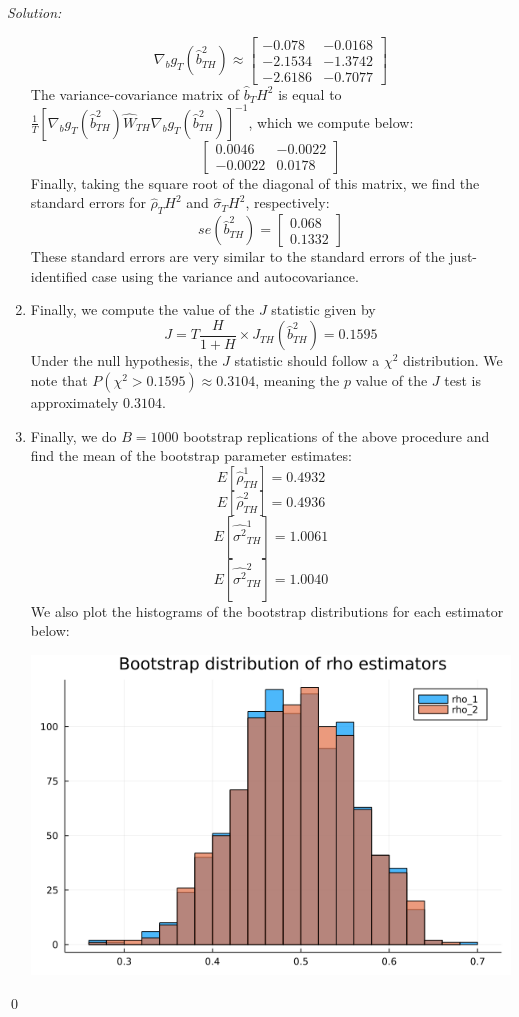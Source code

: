 \documentclass[12pt]{article}
\newenvironment{sol}
    {\emph{Solution:}
    }
    {
    \qed
    }
\begin{document}
\begin{sol}
\begin{enumerate}[label=\alph*) ]
        \[\nabla_b g_T(\hat{b}_{TH}^2) \approx \begin{bmatrix}-0.078 &-0.0168\\ -2.1534& -1.3742\\ -2.6186 &-0.7077\end{bmatrix}\]
        The variance-covariance matrix of $\hat{b}_TH^2$ is equal to $\frac{1}{T}[\nabla_b g_T(\hat{b}_{TH}^2) \hat{W}_{TH} \nabla_b g_T(\hat{b}_{TH}^2)]^{-1}$, which we compute below:
        \[\begin{bmatrix} 0.0046 &-0.0022\\ -0.0022 &0.0178\end{bmatrix}\]
        Finally, taking the square root of the diagonal of this matrix, we find the standard errors for $\hat{\rho}_TH^2$ and $\hat{\sigma}_TH^2$, respectively:
        \[se(\hat{b}_{TH}^2) = \begin{bmatrix} 0.068\\ 0.1332\end{bmatrix}\]
        These standard errors are very similar to the standard errors of the just-identified case using the variance and autocovariance.
        \item Finally, we compute the value of the $J$ statistic given by
        \[J = T \frac{H}{1 + H}\times J_{TH}(\hat{b}_{TH}^2) = 0.1595\]
        Under the null hypothesis, the $J$ statistic should follow a $\chi^2$ distribution. We note that $P(\chi^2 > 0.1595) \approx 0.3104$, meaning the $p$ value of the $J$ test is approximately $0.3104$. 
        \item Finally, we do $B=1000$ bootstrap replications of the above procedure and find the mean of the bootstrap parameter estimates:
        \[E[\hat{\rho}_{TH}^1] = 0.4932\]
        \[E[\hat{\rho}_{TH}^2] = 0.4936\]
        \[E[\hat{\sigma^2}_{TH}^1] = 1.0061\]
        \[E[\hat{\sigma^2}_{TH}^2] = 1.0040\]
        We also plot the histograms of the bootstrap distributions for each estimator below:
        \begin{center}
            \includegraphics[scale=0.5]{rho_bootstrap.png}

\end{center}
\end{enumerate}
\end{sol}
\end{document}
